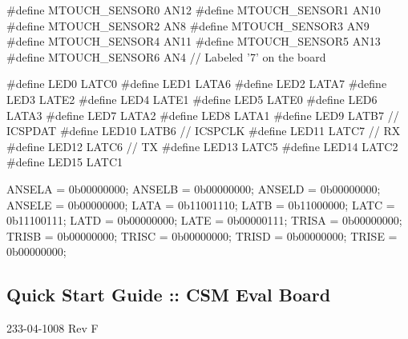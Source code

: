\begin{DoxyCode}
\textcolor{preprocessor}{#define MTOUCH\_SENSOR0              AN12    }
\textcolor{preprocessor}{#define MTOUCH\_SENSOR1              AN10         }
\textcolor{preprocessor}{#define MTOUCH\_SENSOR2              AN8    }
\textcolor{preprocessor}{#define MTOUCH\_SENSOR3              AN9  }
\textcolor{preprocessor}{#define MTOUCH\_SENSOR4              AN11}
\textcolor{preprocessor}{#define MTOUCH\_SENSOR5              AN13}
\textcolor{preprocessor}{#define MTOUCH\_SENSOR6              AN4     // Labeled '7' on the board}

\textcolor{preprocessor}{#define LED0  LATC0}
\textcolor{preprocessor}{#define LED1  LATA6}
\textcolor{preprocessor}{#define LED2  LATA7}
\textcolor{preprocessor}{#define LED3  LATE2}
\textcolor{preprocessor}{#define LED4  LATE1}
\textcolor{preprocessor}{#define LED5  LATE0}
\textcolor{preprocessor}{#define LED6  LATA3}
\textcolor{preprocessor}{#define LED7  LATA2}
\textcolor{preprocessor}{#define LED8  LATA1}
\textcolor{preprocessor}{#define LED9  LATB7     // ICSPDAT}
\textcolor{preprocessor}{#define LED10 LATB6     // ICSPCLK}
\textcolor{preprocessor}{#define LED11 LATC7     // RX}
\textcolor{preprocessor}{#define LED12 LATC6     // TX}
\textcolor{preprocessor}{#define LED13 LATC5}
\textcolor{preprocessor}{#define LED14 LATC2}
\textcolor{preprocessor}{#define LED15 LATC1}

ANSELA  = 0b00000000;
ANSELB  = 0b00000000;
ANSELD  = 0b00000000;
ANSELE  = 0b00000000;
LATA    = 0b11001110;
LATB    = 0b11000000;
LATC    = 0b11100111;
LATD    = 0b00000000;
LATE    = 0b00000111;
TRISA   = 0b00000000;
TRISB   = 0b00000000;
TRISC   = 0b00000000;
TRISD   = 0b00000000;
TRISE   = 0b00000000;
\end{DoxyCode}
 \hypertarget{GSE_RF}{}\subsection{Quick Start Guide \+:\+: C\+S\+M Eval Board}\label{GSE_RF}
\begin{DoxyItemize}
\item 233-\/04-\/1008 Rev F\end{DoxyItemize}

